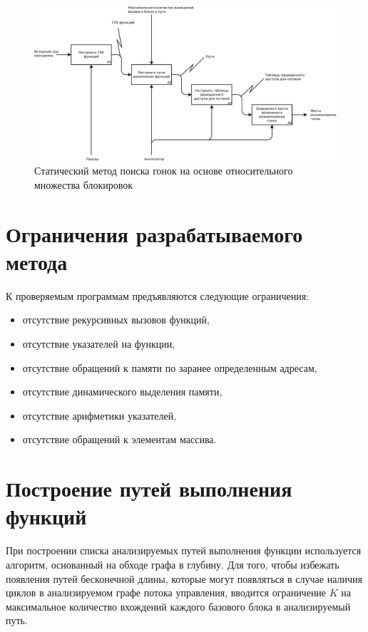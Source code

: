 \begin{figure}
  \centering
  \includegraphics[width=\textwidth]{inc/dia/idef0}
  \caption{Статический метод поиска гонок на основе относительного множества блокировок}
  \label{fig:idef0}
\end{figure}

\section{Ограничения разрабатываемого метода}

К проверяемым программам предъявляются следующие ограничения:
\begin{itemize}
  \item отсутствие рекурсивных вызовов функций,
  \item отсутствие указателей на функции,
  \item отсутствие обращений к памяти по заранее определенным адресам,
  \item отсутствие динамического выделения памяти,
  \item отсутствие арифметики указателей,
  \item отсутствие обращений к элементам массива.
\end{itemize}

 
\section{Построение путей выполнения функций}

При построении списка анализируемых путей выполнения функции используется алгоритм, основанный на обходе графа в глубину. Для того, чтобы избежать появления путей бесконечной длины, которые могут появляться в случае наличия циклов в анализируемом графе потока управления, вводится ограничение $K$ на максимальное количество вхождений каждого базового блока в анализируемый путь.

